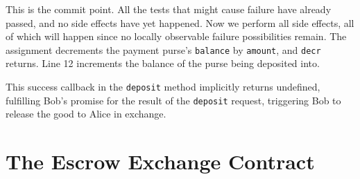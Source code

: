 \documentclass{llncs}
\begin{document}
This is the commit point. All the tests that might cause failure have already passed, and no side effects have yet happened. Now we perform all side effects, all of which will happen since no locally observable failure possibilities remain. The assignment decrements the payment purse's {\tt balance} by {\tt amount}, and {\tt decr} returns. Line 12 increments the balance of the purse being deposited into.

This success callback in the {\tt deposit} method implicitly returns undefined, fulfilling Bob's promise for the result of the {\tt deposit} request, triggering Bob to release the good to Alice in exchange.



\section{The Escrow Exchange Contract}
\end{document}
